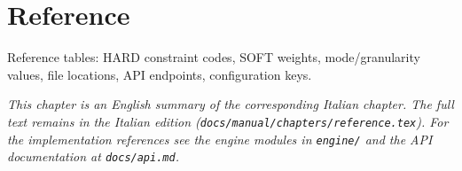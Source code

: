 \chapter{Reference}
\label{ch:reference_en}

Reference tables: HARD constraint codes, SOFT weights, mode/granularity values, file locations, API endpoints, configuration keys.

\medskip
\noindent
\textit{This chapter is an English summary of the corresponding Italian chapter. The full text remains in the Italian edition (\texttt{docs/manual/chapters/reference.tex}). For the implementation references see the engine modules in \texttt{engine/} and the API documentation at \texttt{docs/api.md}.}
